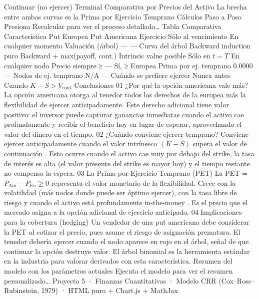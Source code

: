 \documentclass[12pt]{article}
\begin{document}
Continuar (no ejercer)
Terminal
Comparativa por Precios del Activo
La brecha entre ambas curvas es la
Prima por Ejercicio Temprano
Cálculos Paso a Paso
Presiona
Recalcular
para ver el proceso detallado…
Tabla Comparativa
Característica
Put Europea
Put Americana
Ejercicio
Sólo al vencimiento
En cualquier momento
Valuación (árbol)
—
—
Curva del árbol
Backward induction puro
Backward + max(payoff, cont.)
Intrinsic value posible
Sólo en \(t=T\)
En cualquier nodo
Precio siempre ≥
—
Sí, ≥ Europea
Prima por ej. temprano
0.0000
—
Nodos de ej. temprano
N/A
—
Cuándo se prefiere ejercer
Nunca antes
Cuando \(K - S > V_{\text{cont}}\)
Conclusiones
01
¿Por qué la opción americana vale más?
La opción americana otorga al tenedor
todos los derechos
de la europea más la flexibilidad de ejercer anticipadamente. Este derecho adicional tiene valor positivo: el inversor puede capturar ganancias inmediatas cuando el activo cae profundamente y recibir el beneficio
hoy
en lugar de esperar, aprovechando el valor del dinero en el tiempo.
02
¿Cuándo conviene ejercer temprano?
Conviene ejercer anticipadamente cuando el
valor intrínseco
\((K - S)\) supera el
valor de continuación
. Esto ocurre cuando el activo cae muy por debajo del strike, la tasa de interés es alta (el valor presente del strike es mayor hoy) y el tiempo restante no compensa la espera.
03
La Prima por Ejercicio Temprano (PET)
La PET = \(P_{\text{Am}} - P_{\text{Eu}} \geq 0\) representa el valor monetario de la flexibilidad. Crece con la volatilidad (más nodos donde puede ser óptimo ejercer), con la tasa libre de riesgo y cuando el activo está profundamente
in-the-money
. Es el precio que el mercado asigna a la opción adicional de ejercicio anticipado.
04
Implicaciones para la cobertura (hedging)
Un vendedor de una put americana debe considerar la PET al cotizar el precio, pues asume el riesgo de asignación prematura. El tenedor debería ejercer cuando el nodo aparece en rojo en el árbol, señal de que continuar la opción destruye valor. El árbol binomial es la herramienta estándar en la industria para valorar derivados con esta característica.
Resumen del modelo con los parámetros actuales
Ejecuta el modelo para ver el resumen personalizado…
Proyecto 5 · Finanzas Cuantitativas · Modelo CRR (Cox–Ross–Rubinstein, 1979) · HTML puro + Chart.js + MathJax
\end{document}
